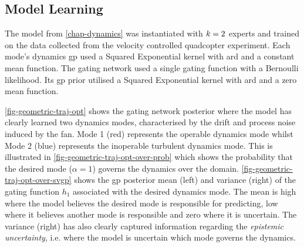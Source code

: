 \documentclass{mimosis-class/mimosis}
\numberwithin{equation}{chapter}
\newcommand{\modeInd}{\ensuremath{k}}
\newcommand{\ModeInd}{\ensuremath{\MakeUppercase{\modeInd}}}
\newcommand{\modeVar}{\ensuremath{\alpha}}
\newcommand{\gatingFunc}{\ensuremath{h}}
\begin{document}
{\subsection{Model Learning}
\label{sec:orgc4c320b}
The model from \cref{chap-dynamics} was instantiated with \(\ModeInd=2\) experts and trained on
the data collected from the velocity controlled quadcopter experiment.
Each mode's dynamics \acrshort{gp} used a Squared Exponential kernel with \acrfull{ard} and a constant mean function.
The gating network used a single gating function with a Bernoulli likelihood.
Its \acrshort{gp} prior utilised a Squared Exponential kernel with \acrshort{ard} and a zero mean function.

\cref{fig-geometric-traj-opt} shows the gating network posterior where the model has clearly learned
two dynamics modes, characterised by the drift and process noise induced by the fan.
Mode 1 (red) represents the operable dynamics mode whilst Mode 2 (blue)
represents the inoperable turbulent dynamics mode.
This is illustrated in \cref{fig-geometric-traj-opt-over-prob} which shows the probability that
the desired mode (\(\modeVar = 1\)) governs the dynamics over the domain.
\cref{fig-geometric-traj-opt-over-svgp} shows the \acrshort{gp} posterior mean (left) and variance (right) of the
gating function \(\gatingFunc_1\) associated with the desired dynamics mode.
The mean is high where the model believes the desired mode is responsible for predicting, low where it
believes another mode is responsible and zero where it is uncertain.
The variance (right) has also clearly captured information regarding the \emph{epistemic uncertainty},
i.e. where the model is uncertain which mode governs the dynamics.

}
\end{document}
